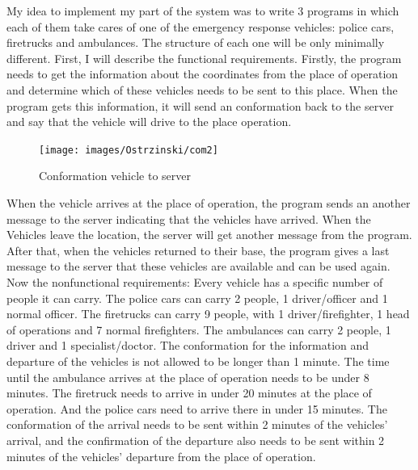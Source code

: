 \documentclass{article}
\begin{document}
\clearpage
My idea to implement my part of the system was to write 3 programs in which each of them take cares of one of the emergency response vehicles: police cars, firetrucks and ambulances. The structure of each one will be only minimally different. First, I will describe the functional requirements.
\newline
Firstly, the program needs to get the information about the coordinates from the place of operation and determine which of these vehicles needs to be sent to this place. When the program gets this information, it will send an conformation back to the server and say that the vehicle will drive to the place operation. 
\newline

\begin{figure}[htp]
    \centering
\texttt{[image: images/Ostrzinski/com2]}
    \caption{Conformation vehicle to server}
    \label{fig:GALAXY}
\end{figure}

When the vehicle arrives at the place of operation, the program sends an another message to the server indicating that the vehicles have arrived. When the Vehicles leave the location, the server will get another message from the program. After that, when the vehicles returned to their base, the program gives a last message to the server that these vehicles are available and can be used again.
\newline
\newline
Now the nonfunctional requirements: Every vehicle has a specific number of people it can carry. The police cars can carry 2 people, 1 driver/officer and 1 normal officer. The firetrucks can carry 9 people, with 1 driver/firefighter, 1 head of operations and 7 normal firefighters. The ambulances can carry 2 people, 1 driver and 1 specialist/doctor. 
\newline
The conformation for the information and departure of the vehicles is not allowed to be longer than 1 minute. The time until the ambulance arrives at the place of operation needs to be under 8 minutes. The firetruck needs to arrive in under 20 minutes at the place of operation. And the police cars need to arrive there in under 15 minutes. 
\newline
The conformation of the arrival needs to be sent within 2 minutes of the vehicles' arrival, and the confirmation of the departure also needs to be sent within 2 minutes of the vehicles' departure from the place of operation.
\end{document}
